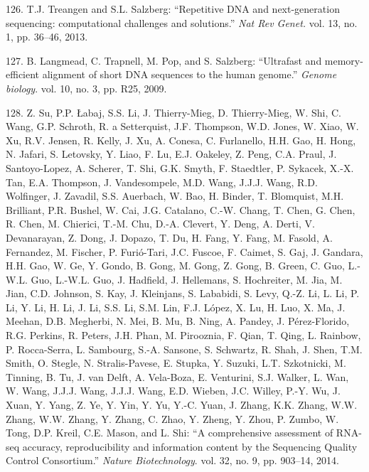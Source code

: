 \documentclass[12pt,twoside]{reedthesis}
\theoremstyle{definition}
\theoremstyle{definition}
\theoremstyle{remark}
\begin{document}
  \hypertarget{ref-Treangen2013}{}
  126. T.J. Treangen and S.L. Salzberg: ``Repetitive DNA and
  next-generation sequencing: computational challenges and solutions.''
  \emph{Nat Rev Genet.} vol. 13, no. 1, pp. 36--46, 2013.
  
  \hypertarget{ref-Langmead2009}{}
  127. B. Langmead, C. Trapnell, M. Pop, and S. Salzberg: ``Ultrafast and
  memory-efficient alignment of short DNA sequences to the human genome.''
  \emph{Genome biology}. vol. 10, no. 3, pp. R25, 2009.
  
  \hypertarget{ref-Su2014}{}
  128. Z. Su, P.P. Łabaj, S.S. Li, J. Thierry-Mieg, D. Thierry-Mieg, W.
  Shi, C. Wang, G.P. Schroth, R. a Setterquist, J.F. Thompson, W.D. Jones,
  W. Xiao, W. Xu, R.V. Jensen, R. Kelly, J. Xu, A. Conesa, C. Furlanello,
  H.H. Gao, H. Hong, N. Jafari, S. Letovsky, Y. Liao, F. Lu, E.J. Oakeley,
  Z. Peng, C.A. Praul, J. Santoyo-Lopez, A. Scherer, T. Shi, G.K. Smyth,
  F. Staedtler, P. Sykacek, X.-X. Tan, E.A. Thompson, J. Vandesompele,
  M.D. Wang, J.J.J. Wang, R.D. Wolfinger, J. Zavadil, S.S. Auerbach, W.
  Bao, H. Binder, T. Blomquist, M.H. Brilliant, P.R. Bushel, W. Cai, J.G.
  Catalano, C.-W. Chang, T. Chen, G. Chen, R. Chen, M. Chierici, T.-M.
  Chu, D.-A. Clevert, Y. Deng, A. Derti, V. Devanarayan, Z. Dong, J.
  Dopazo, T. Du, H. Fang, Y. Fang, M. Fasold, A. Fernandez, M. Fischer, P.
  Furió-Tari, J.C. Fuscoe, F. Caimet, S. Gaj, J. Gandara, H.H. Gao, W. Ge,
  Y. Gondo, B. Gong, M. Gong, Z. Gong, B. Green, C. Guo, L.-W.L. Guo,
  L.-W.L. Guo, J. Hadfield, J. Hellemans, S. Hochreiter, M. Jia, M. Jian,
  C.D. Johnson, S. Kay, J. Kleinjans, S. Lababidi, S. Levy, Q.-Z. Li, L.
  Li, P. Li, Y. Li, H. Li, J. Li, S.S. Li, S.M. Lin, F.J. López, X. Lu, H.
  Luo, X. Ma, J. Meehan, D.B. Megherbi, N. Mei, B. Mu, B. Ning, A. Pandey,
  J. Pérez-Florido, R.G. Perkins, R. Peters, J.H. Phan, M. Pirooznia, F.
  Qian, T. Qing, L. Rainbow, P. Rocca-Serra, L. Sambourg, S.-A. Sansone,
  S. Schwartz, R. Shah, J. Shen, T.M. Smith, O. Stegle, N. Stralis-Pavese,
  E. Stupka, Y. Suzuki, L.T. Szkotnicki, M. Tinning, B. Tu, J. van Delft,
  A. Vela-Boza, E. Venturini, S.J. Walker, L. Wan, W. Wang, J.J.J. Wang,
  J.J.J. Wang, E.D. Wieben, J.C. Willey, P.-Y. Wu, J. Xuan, Y. Yang, Z.
  Ye, Y. Yin, Y. Yu, Y.-C. Yuan, J. Zhang, K.K. Zhang, W.W. Zhang, W.W.
  Zhang, Y. Zhang, C. Zhao, Y. Zheng, Y. Zhou, P. Zumbo, W. Tong, D.P.
  Kreil, C.E. Mason, and L. Shi: ``A comprehensive assessment of RNA-seq
  accuracy, reproducibility and information content by the Sequencing
  Quality Control Consortium.'' \emph{Nature Biotechnology}. vol. 32, no.
  9, pp. 903--14, 2014.
  
\end{document}
